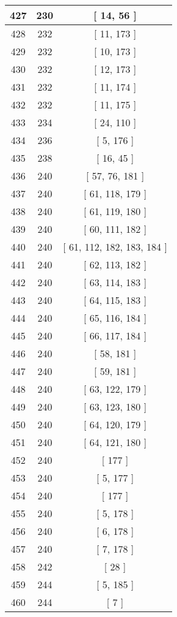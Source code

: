 \begin{center}
\begin{longtable}[H]{|| c c c ||}
\hline
427 & 230 & [ 14, 56 ] \\ 
\hline
428 & 232 & [ 11, 173 ] \\ 
\hline
429 & 232 & [ 10, 173 ] \\ 
\hline
430 & 232 & [ 12, 173 ] \\ 
\hline
431 & 232 & [ 11, 174 ] \\ 
\hline
432 & 232 & [ 11, 175 ] \\ 
\hline
433 & 234 & [ 24, 110 ] \\ 
\hline
434 & 236 & [ 5, 176 ] \\ 
\hline
435 & 238 & [ 16, 45 ] \\ 
\hline
436 & 240 & [ 57, 76, 181 ] \\ 
\hline
437 & 240 & [ 61, 118, 179 ] \\ 
\hline
438 & 240 & [ 61, 119, 180 ] \\ 
\hline
439 & 240 & [ 60, 111, 182 ] \\ 
\hline
440 & 240 & [ 61, 112, 182, 183, 184 ] \\ 
\hline
441 & 240 & [ 62, 113, 182 ] \\ 
\hline
442 & 240 & [ 63, 114, 183 ] \\ 
\hline
443 & 240 & [ 64, 115, 183 ] \\ 
\hline
444 & 240 & [ 65, 116, 184 ] \\ 
\hline
445 & 240 & [ 66, 117, 184 ] \\ 
\hline
446 & 240 & [ 58, 181 ] \\ 
\hline
447 & 240 & [ 59, 181 ] \\ 
\hline
448 & 240 & [ 63, 122, 179 ] \\ 
\hline
449 & 240 & [ 63, 123, 180 ] \\ 
\hline
450 & 240 & [ 64, 120, 179 ] \\ 
\hline
451 & 240 & [ 64, 121, 180 ] \\ 
\hline
452 & 240 & [ 177 ] \\ 
\hline
453 & 240 & [ 5, 177 ] \\ 
\hline
454 & 240 & [ 177 ] \\ 
\hline
455 & 240 & [ 5, 178 ] \\ 
\hline
456 & 240 & [ 6, 178 ] \\ 
\hline
457 & 240 & [ 7, 178 ] \\ 
\hline
458 & 242 & [ 28 ] \\ 
\hline
459 & 244 & [ 5, 185 ] \\ 
\hline
460 & 244 & [ 7 ] \\ 

\end{longtable}
\end{center}
